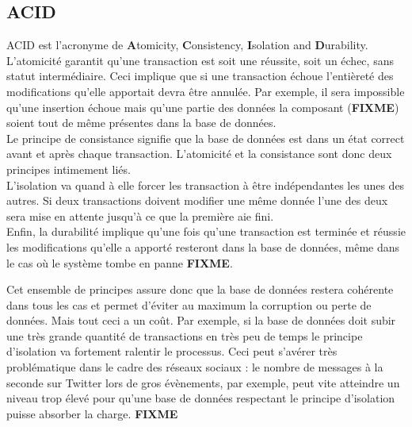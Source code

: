 \documentclass[11pt]{article}
\begin{document}
\subsection{ACID}
ACID est l'acronyme de \textbf{A}tomicity, \textbf{C}onsistency, \textbf{I}solation and \textbf{D}urability. L'atomicité garantit qu'une transaction est soit une réussite, soit un échec, sans statut intermédiaire. Ceci implique que si une transaction échoue l'entièreté des modifications qu'elle apportait devra être annulée. Par exemple, il sera impossible qu'une insertion échoue mais qu'une partie des données la composant (\colorbox{BrickRed}{\textbf{FIXME}}) soient tout de même présentes dans la base de données. \\
Le principe de consistance signifie que la base de données est dans un état correct avant et après chaque transaction. L'atomicité et la consistance sont donc deux principes intimement liés. \\
L'isolation va quand à elle forcer les transaction à être indépendantes les unes des autres. Si deux transactions doivent modifier une même donnée l'une des deux sera mise en attente jusqu'à ce que la première aie fini. \\
Enfin, la durabilité implique qu'une fois qu'une transaction est terminée et réussie les modifications qu'elle a apporté resteront dans la base de données, même dans le cas où le système tombe en panne \colorbox{BrickRed}{\textbf{FIXME}}.

Cet ensemble de principes assure donc que la base de données restera cohérente dans tous les cas et permet d'éviter au maximum la corruption ou perte de données. Mais tout ceci a un coût. Par exemple, si la base de données doit subir une très grande quantité de transactions en très peu de temps le principe d'isolation va fortement ralentir le processus. Ceci peut s'avérer très problématique dans le cadre des réseaux sociaux : le nombre de messages à la seconde sur Twitter lors de gros évènements, par exemple, peut vite atteindre un niveau trop élevé pour qu'une base de données respectant le principe d'isolation puisse absorber la charge. \colorbox{BrickRed}{\textbf{FIXME}}
\end{document}
